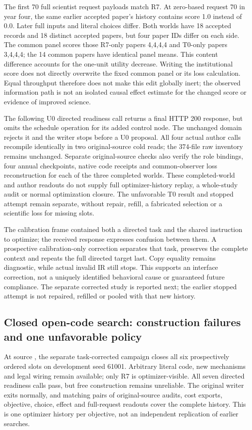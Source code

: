 The first 70 full scientist request payloads match R7. At zero-based request
70 in year four, the same earlier accepted paper's history contains score
1.0 instead of 0.0. Later full inputs and literal choices differ. Both worlds
have 18 accepted records and 18 distinct accepted papers, but four paper IDs
differ on each side. The common panel scores those R7-only papers 4,4,4,4
and T0-only papers 3,4,4,4; the 14 common papers have identical panel means.
This content difference accounts for the one-unit utility decrease. Writing
the institutional score does not directly overwrite the fixed common panel
or its loss calculation. Equal throughput therefore does not make this edit
globally inert; the observed information path is not an isolated causal effect
estimate for the changed score or evidence of improved science.

The following U0 directed readiness call returns a final HTTP 200 response,
but omits the schedule operation for its added control node. The unchanged
domain rejects it and the writer stops before a U0 proposal. All four actual
author calls recompile identically in two original-source cold reads; the
374-file raw inventory remains unchanged. Separate original-source checks also
verify the role bindings, four annual checkpoints, native code receipts and
common-observer loss reconstruction for each of the three completed worlds.
These completed-world and author readouts do not supply full optimizer-history
replay, a whole-study audit or normal optimization closure. The
unfavorable T0 result and stopped attempt remain separate, without repair,
refill, a fabricated selection or a scientific loss for missing slots.

The calibration frame contained both a directed task and the shared instruction
to optimize; the received response expresses confusion between them. A
prospective calibration-only correction separates that task, preserves the
complete context and repeats the full directed target last. Copy equality
remains diagnostic, while actual invalid IR still stops. This supports an
interface correction, not a uniquely identified behavioral cause or guaranteed
future compliance. The separate corrected study is reported next; the earlier
stopped attempt is not repaired, refilled or pooled with that new history.

\subsection{Closed open-code search: construction failures and one unfavorable policy}
At source , the separate task-corrected campaign closes all six
prospectively ordered slots on development seed 61001. Arbitrary literal code,
new mechanisms and legal wiring remain available; only R7 is optimizer-visible.
All seven directed readiness calls pass, but free construction remains unreliable.
The original writer exits normally, and matching pairs of original-source
audits, cost exports, objective, choice, effect and full-request readouts cover
the complete history. This is one optimizer history per objective, not an
independent replication of earlier searches.

